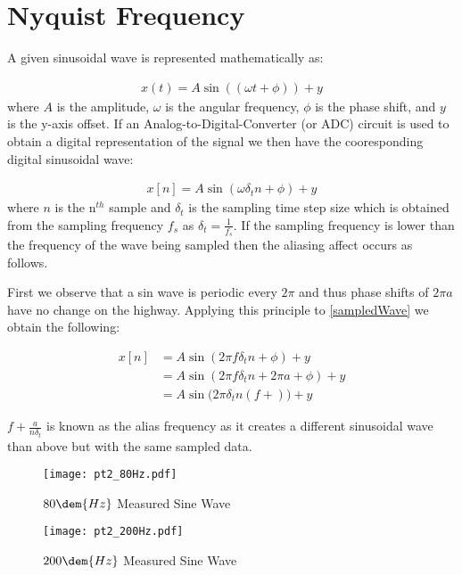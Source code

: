 \documentclass[main.tex]{subfile}
\begin{document}
\section{Nyquist Frequency} 
\label{sec:nyquist_frequency}

A given sinusoidal wave is represented mathematically as:

\begin{align}
  x(t) = A\sin{((\omega t + \phi))} + y
\end{align}
where $A$ is the amplitude, $\omega$ is the angular frequency, $\phi$ is the
phase shift, and $y$ is the y-axis offset. If an Analog-to-Digital-Converter (or
ADC) circuit is used to obtain a digital representation of the signal we then
have the cooresponding digital sinusoidal wave: 

\begin{align}
  x[n] = A\sin{(\omega \delta_{t} n + \phi)} + y \label{eq:sampledWave}
\end{align}
where $n$ is the n$^{th}$ sample and $\delta_{t}$ is the sampling time step size
which is obtained from the sampling frequency $f_s$ as $\delta_{t} =
\frac{1}{f_s}$. If the sampling frequency is lower than the frequency of the
wave being sampled then the aliasing affect occurs as follows.

First we observe that a sin wave is periodic every $2\pi$ and thus phase shifts
of $2\pi a$ have no change on the highway. Applying this principle to \eqref{sampledWave}
we obtain the following:

\begin{align}
  x[n] &= A\sin{(2\pi f \delta_{t} n + \phi)} + y \label{eq:sampledWave}
  \\&= A\sin{(2\pi f \delta_{t} n + 2\pi a + \phi)} + y
  \\&= A\sin{(2\pi \delta_{t} n (f + )}) + y
\end{align}

$f + \frac{a}{n\delta_{t}}$ is known as the alias frequency as it creates a different
sinusoidal wave than above but with the same sampled data.


\begin{figure}[H]
  \begin{center}
    \texttt{[image: pt2\_80Hz.pdf]}
  \end{center}
  \caption{$80\dem{Hz}$ Measured Sine Wave}
  \label{fig:pt280hz}
\end{figure}

\begin{figure}[H]
  \begin{center}
    \texttt{[image: pt2\_200Hz.pdf]}
  \end{center}
  \caption{$200\dem{Hz}$ Measured Sine Wave}
  \label{fig:pt280hz}
\end{figure}
\end{document}
